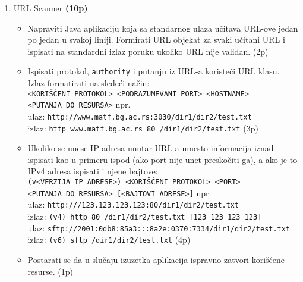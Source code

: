 \documentclass[]{article}
\begin{document}
\begin{enumerate}
  \item URL Scanner \textbf{(10p)}
  \begin{itemize}
    \item Napraviti Java aplikaciju koja sa standarnog ulaza u\v{c}itava URL-ove jedan po jedan u svakoj liniji. Formirati URL objekat za svaki u\v{c}itani URL i ispisati na standardni izlaz poruku ukoliko URL nije validan. \hfill (2p)
    \item Ispisati protokol, \texttt{authority} i putanju iz URL-a koriste\'c{}i URL klasu. Izlaz formatirati na slede\'c{}i na\v{c}in:\\
    \texttt{<KORI\v{S}\'C{}ENI\_PROTOKOL> <PODRAZUMEVANI\_PORT> <HOSTNAME> <PUTANJA\_DO\_RESURSA>} npr.\\
    ulaz: \texttt{http://www.matf.bg.ac.rs:3030/dir1/dir2/test.txt} \\
    izlaz: \texttt{http www.matf.bg.ac.rs 80 /dir1/dir2/test.txt} \hfill (3p) 
    \item Ukoliko se unese IP adresa unutar URL-a umesto informacija iznad ispisati kao u primeru ispod (ako port nije unet presko\v{c}iti ga), a ako je to IPv4 adresa ispisati i njene bajtove:\\
    \texttt{(v<VERZIJA\_IP\_ADRESE>) <KORI\v{S}\'C{}ENI\_PROTOKOL> <PORT> <PUTANJA\_DO\_RESURSA> [<BAJTOVI\_ADRESE>]} npr.\\
    ulaz: \texttt{http:///123.123.123.123:80/dir1/dir2/test.txt} \\
    izlaz: \texttt{(v4) http 80 /dir1/dir2/test.txt [123 123 123 123]} \\ 
    ulaz: \texttt{sftp://2001:0db8:85a3:::8a2e:0370:7334/dir1/dir2/test.txt} \\
    izlaz: \texttt{(v6) sftp /dir1/dir2/test.txt} \hfill (4p) 
    \item Postarati se da u slu\v{c}aju izuzetka aplikacija ispravno zatvori kori\v{s}\'c{}ene resurse. \hfill (1p)
  \end{itemize}
\end{enumerate}
\end{document}
